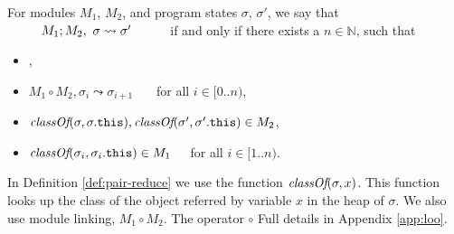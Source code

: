 \begin{definition}
\label{def:pair-reduce}
For  
  modules $M_1$,  $M_2$, and program states $\sigma$, $\sigma'$, 
we say that $\ \ \ \ \ \ \ \ \reduction{M_1}{M_2}{\sigma}{\sigma'}\ \ \ \ \ \ \ \ $ if and only if there exists a 
$n\in\mathbb{N}$, such that
\begin{itemize}
\item
{},
\item
$M_1 \circ M_2, \sigma_i \leadsto \sigma_{i+1}$  \ \ \ for all $i\in [0..n)$,
\item
$\textit{classOf}(\sigma, \sigma.{\texttt{this}}), \textit{classOf}(\sigma', \sigma'.{\texttt{this}})\in M_2$,
\item
$\textit{classOf}(\sigma_i, \sigma_i.{\texttt{this}}) \in M_1$\ \ \ for all $i\in [1..n)$.
\end{itemize} 
%
\end{definition}
In Definition \ref{def:pair-reduce}  %
we  use  the function
$\textit{classOf}(\sigma, x)$. This function looks up 
the class of   the object referred by variable $x$ in the heap of $\sigma$. 
We also use module linking, $M_1\circ M_2$. The operator $\circ$
Full details in  Appendix \ref{app:loo}.
